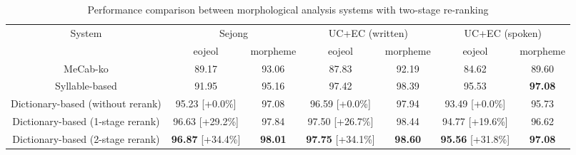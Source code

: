\documentclass[AMS,STIX2COL]{WileyNJD-v2}
\begin{document}
    \begin{table}[ht]
        \caption{Performance comparison between morphological analysis systems with two-stage re-ranking}
        \label{tab:performance-with-reranking}
        \begin{tabular*}{500pt}{@{\extracolsep\fill}c|cccccc@{\extracolsep\fill}}
            \toprule
            \multirow{2}{*}{System}                       & \multicolumn{2}{c}{Sejong}                                             & \multicolumn{2}{c}{UC+EC (written)}                                    & \multicolumn{2}{c}{UC+EC (spoken)}                                     \\
            \cmidrule{2-3} \cmidrule{4-5} \cmidrule{6-7}
            ~                                             & \multicolumn{1}{c}{eojeol}              & \multicolumn{1}{c}{morpheme} & \multicolumn{1}{c}{eojeol}              & \multicolumn{1}{c}{morpheme} & \multicolumn{1}{c}{eojeol}              & \multicolumn{1}{c}{morpheme} \\
            \midrule
            \hspace{2mm}MeCab-ko                          & 89.17                                   & 93.06                        & 87.83                                   & 92.19                        & 84.62                                   & 89.60                        \\
            \hspace{2mm}Syllable-based                    & 91.95                                   & 95.16                        & 97.42                                   & 98.39                        & 95.53                                   & \textbf{97.08}               \\
            \hspace{2mm}Dictionary-based (without rerank) & 95.23\footnotesize{ [+0.0\%]}           & 97.08                        & 96.59\footnotesize{ [+0.0\%]}           & 97.94                        & 93.49\footnotesize{ [+0.0\%]}           & 95.73                        \\
            \hspace{2mm}Dictionary-based (1-stage rerank) & 96.63\footnotesize{ [+29.2\%]}          & 97.84                        & 97.50\footnotesize{ [+26.7\%]}          & 98.44                        & 94.77\footnotesize{ [+19.6\%]}          & 96.62                        \\
            \hspace{2mm}Dictionary-based (2-stage rerank) & \textbf{96.87}\footnotesize{ [+34.4\%]} & \textbf{98.01}               & \textbf{97.75}\footnotesize{ [+34.1\%]} & \textbf{98.60}               & \textbf{95.56}\footnotesize{ [+31.8\%]} & \textbf{97.08}               \\

\end{tabular*}
\end{table}
\end{document}
